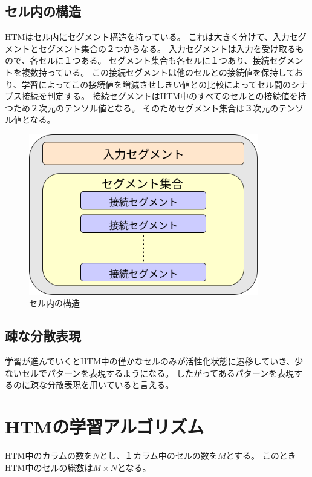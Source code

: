 \subsection{セル内の構造}
HTMはセル内にセグメント構造を持っている。
これは大きく分けて、入力セグメントとセグメント集合の２つからなる。
入力セグメントは入力を受け取るもので、各セルに１つある。
セグメント集合も各セルに１つあり、接続セグメントを複数持っている。
この接続セグメントは他のセルとの接続値を保持しており、学習によってこの接続値を増減させしきい値との比較によってセル間のシナプス接続を判定する。
接続セグメントはHTM中のすべてのセルとの接続値を持つため２次元のテンソル値となる。
そのためセグメント集合は３次元のテンソル値となる。

\vspace{5mm}
\begin{figure}[ht]
  \begin{center}
    \includegraphics[width=10cm]{./fig/drawing_4}
    \caption{セル内の構造}
    \label{fig:cell_structure}
  \end{center}
\end{figure}

\subsection{疎な分散表現}
学習が進んでいくとHTM中の僅かなセルのみが活性化状態に遷移していき、少ないセルでパターンを表現するようになる。
したがってあるパターンを表現するのに疎な分散表現を用いていると言える。

\section{HTMの学習アルゴリズム}

HTM中のカラムの数を$N$とし、１カラム中のセルの数を$M$とする。
このときHTM中のセルの総数は$M \times N$となる。

